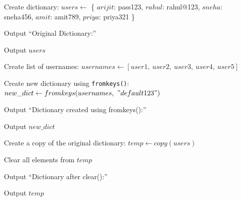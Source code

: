\begin{algorithm}
\caption{Demonstrate Dictionary Methods}
\begin{algorithmic}[1]

\STATE Create dictionary:
\STATE $users \gets$
\{
$arijit$: pass123,
$rahul$: rahul@123,
$sneha$: sneha456,
$amit$: amit789,
$priya$: priya321
\}

\STATE Output ``Original Dictionary:''

\STATE Output $users$

\STATE Create list of usernames:
\STATE $usernames \gets [user1,\ user2,\ user3,\ user4,\ user5]$

\STATE Create new dictionary using \texttt{fromkeys()}:
\STATE $new\_dict \gets fromkeys(usernames,\ "default123")$

\STATE Output ``Dictionary created using fromkeys():''

\STATE Output $new\_dict$

\STATE Create a copy of the original dictionary:
\STATE $temp \gets copy(users)$

\STATE Clear all elements from $temp$

\STATE Output ``Dictionary after clear():''

\STATE Output $temp$

\end{algorithmic}
\end{algorithm}